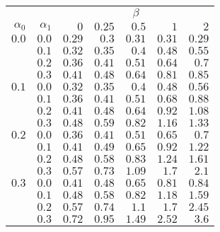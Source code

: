 \begin{tabular}{rr|rrrrr}
\hline\hline
 && \multicolumn{5}{c}{$\beta$}\\
 $\alpha_0$ & $\alpha_1$ & $0$ & $0.25$ & $0.5$ & $1$ & $2$ \\ 
 \hline
$0.0$ & $0.0$ & $0.29$ & $0.3$ & $0.31$ & $0.31$ & $0.29$\\ 
 & $0.1$ & $0.32$ & $0.35$ & $0.4$ & $0.48$ & $0.55$\\ 
 & $0.2$ & $0.36$ & $0.41$ & $0.51$ & $0.64$ & $0.7$\\ 
 & $0.3$ & $0.41$ & $0.48$ & $0.64$ & $0.81$ & $0.85$\\ 
\hline 
 $0.1$ & $0.0$ & $0.32$ & $0.35$ & $0.4$ & $0.48$ & $0.56$\\ 
 & $0.1$ & $0.36$ & $0.41$ & $0.51$ & $0.68$ & $0.88$\\ 
 & $0.2$ & $0.41$ & $0.48$ & $0.64$ & $0.92$ & $1.08$\\ 
 & $0.3$ & $0.48$ & $0.59$ & $0.82$ & $1.16$ & $1.33$\\ 
\hline 
 $0.2$ & $0.0$ & $0.36$ & $0.41$ & $0.51$ & $0.65$ & $0.7$\\ 
 & $0.1$ & $0.41$ & $0.49$ & $0.65$ & $0.92$ & $1.22$\\ 
 & $0.2$ & $0.48$ & $0.58$ & $0.83$ & $1.24$ & $1.61$\\ 
 & $0.3$ & $0.57$ & $0.73$ & $1.09$ & $1.7$ & $2.1$\\ 
\hline 
 $0.3$ & $0.0$ & $0.41$ & $0.48$ & $0.65$ & $0.81$ & $0.84$\\ 
 & $0.1$ & $0.48$ & $0.58$ & $0.82$ & $1.18$ & $1.59$\\ 
 & $0.2$ & $0.57$ & $0.74$ & $1.1$ & $1.7$ & $2.45$\\ 
 & $0.3$ & $0.72$ & $0.95$ & $1.49$ & $2.52$ & $3.6$\\ 
 \hline 
 \end{tabular}
